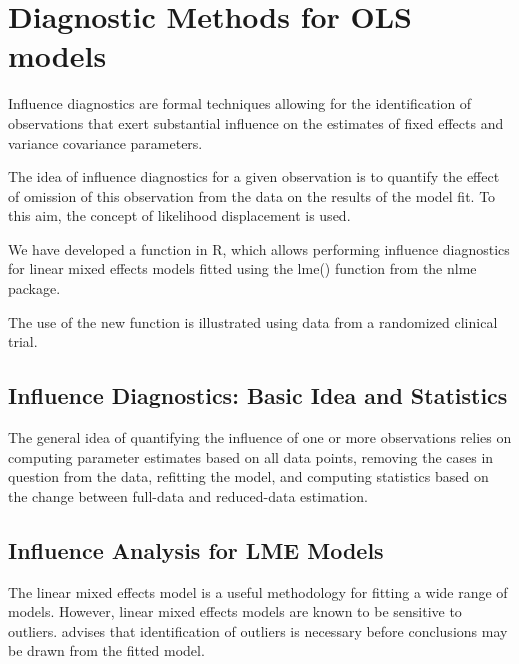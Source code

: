 \section{Diagnostic Methods for OLS models}
Influence diagnostics are formal techniques allowing for the identification of observations that exert substantial 
influence on the estimates of fixed effects and variance covariance parameters. 

The idea of influence diagnostics for a given observation is to quantify the effect of omission of this observation 
from the data on the results of the model fit. To this aim, the concept of likelihood displacement is used. 

We have developed a function in R, which allows performing influence diagnostics for linear mixed effects models 
fitted using the lme() function from the nlme package. 

The use of the new function is illustrated using data from a randomized clinical trial.


\subsection{Influence Diagnostics: Basic Idea and Statistics} %

The general idea of quantifying the influence of one or more observations relies on computing parameter estimates based on all data points, removing the cases in question from the data, refitting the model, and computing statistics based on the change between full-data and reduced-data estimation. 



\subsection{Influence Analysis for LME Models} %
The linear mixed effects model is a useful methodology for fitting a wide range of models. However, linear mixed effects models are known to be sensitive to outliers. \citet{CPJ} advises that identification of outliers is necessary before conclusions may be drawn from the fitted model.

